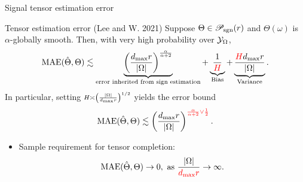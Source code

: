 \documentclass[10pt, mathserif]{beamer} %
\theoremstyle{definition}
\theoremstyle{plain}
\def\caliP{\mathscr{P}_{\textup{sgn}}}
\newcommand*{\KeepStyleUnderBrace}[1]{%
\mathop{%
\mathchoice
{\underbrace{\displaystyle#1}}%
{\underbrace{\textstyle#1}}%
{\underbrace{\scriptstyle#1}}%
{\underbrace{\scriptscriptstyle#1}}%
}\limits
}
\def\caliP{\mathscr{P}_{\textup{sgn}}}
\begin{document}
\begin{frame}{Signal tensor estimation error}
    \begin{block}{Tensor estimation error (Lee and W. 2021)}
    Suppose $\Theta\in\caliP(r)$ and  $\Theta(\omega)$ is $\alpha$-globally smooth. Then, with very high probability over $\mathcal{Y}_\Omega$, 
    \begin{equation}\label{eq:bound2}
\textup{MAE}(\hat \Theta, \Theta)\lesssim \KeepStyleUnderBrace{\left({d_{\max} r \over |\Omega|}\right)^{\alpha\over\alpha+2}}_{\text{error inherited from sign estimation}}+\KeepStyleUnderBrace{{1\over \color{red}H}}_{\text{Bias}}+\KeepStyleUnderBrace{{{\color{red}H}d_{\max} r \over |\Omega|}}_{\text{Variance}}.
\end{equation}
In particular, setting $\scriptstyle H\asymp \left( |\Omega|\over d_{\max}r\right)^{1/2}$ yields the error bound
\begin{equation}\label{eq:real}
\textup{MAE}(\hat \Theta, \Theta)\lesssim \left(d_{\max}r \over |\Omega|\right)^{\color{red}{\alpha \over \alpha+2} \vee {1\over 2}}.
\end{equation}
    \end{block}
    \begin{itemize}
        \item Sample requirement for tensor completion:
         \[\text{MAE}(\hat\Theta,\Theta)\rightarrow 0, \text{ as } {|\Omega|\over {\color{red}d_{\max}r}}\rightarrow\infty.\]
    \end{itemize}
\end{frame}
\end{document}
